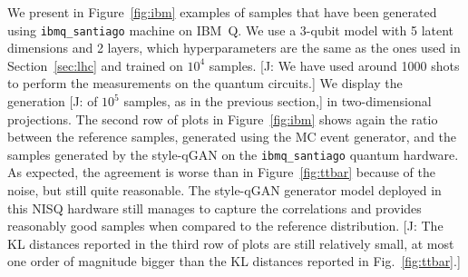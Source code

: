 \documentclass[twocolumn,preprintnumbers,superscriptaddress]{revtex4-2}
\newcommand{\commentJB}[1]{{\color{blue} {[J: #1]}}}
\begin{document}
We present in Figure~\ref{fig:ibm} examples of samples that have been
generated using {\tt ibmq\_santiago} machine on IBM~Q. We use a 3-qubit
model with 5 latent dimensions and 2 layers, which hyperparameters are
the same as the ones used in Section~\ref{sec:lhc} and trained on
$10^4_{}$ samples. \commentJB{We have used around 1000 shots to perform the measurements on the
quantum circuits.} We display the generation \commentJB{of $10^5_{}$ samples, as in the previous section,}
in two-dimensional projections. The second row of plots in
Figure~\ref{fig:ibm} shows again the ratio between the reference
samples, generated using the MC event generator, and the samples
generated by the style-qGAN on the {\tt ibmq\_santiago} quantum
hardware. As expected, the agreement is worse than in
Figure~\ref{fig:ttbar} because of the noise, but still quite
reasonable. The
style-qGAN generator model deployed in this NISQ hardware still
manages to capture the correlations and provides reasonably good
samples when compared to the reference distribution.
\commentJB{The KL distances reported in the third row of plots are still relatively small, at most one
  order of magnitude bigger than the KL distances reported in Fig.~\ref{fig:ttbar}.}
\end{document}
